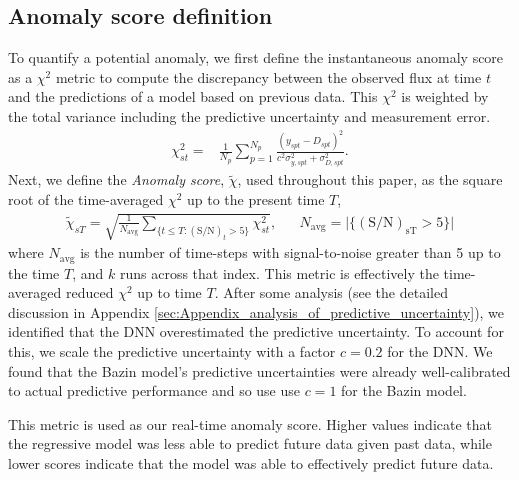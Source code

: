 \documentclass[fleqn,usenatbib]{mnras}
\begin{document}
\subsection{Anomaly score definition}
\label{sec:Anomaly_score_definition}
To quantify a potential anomaly, we first define the instantaneous anomaly score as a $\chi^2$ metric to compute the discrepancy between the observed flux at time $t$ and the predictions of a model based on previous data. This $\chi^2$ is weighted by the total variance including the predictive uncertainty and measurement error.
\begin{equation}
    \begin{split}
    \chi^2_{st} = & \frac{1}{N_p} \sum^{N_p}_{p=1} { \frac{\left( y_{spt}-D_{spt} \right)^2}{ c^2 \sigma_{y,{spt}}^2 + \sigma_{D,{spt}}^2} }.
    \end{split}
\label{eq:instantaneous_anomaly_score}
\end{equation}
Next, we define the \textit{Anomaly score}, $\tilde{\chi}$, used throughout this paper, as the square root of the time-averaged $\chi^2$ up to the present time $T$,
\begin{align}
    \tilde{\chi}_{sT} = \sqrt{ \frac{1}{N_\mathrm{avg}} \sum_{\{t \le T : \mathrm{(S/N)}_t > 5 \}} {\chi^2_{st}}}, && N_\mathrm{avg} = \lvert \{ \mathrm{(S/N)_{sT}} > 5 \} \rvert
    \label{eq:Anomaly_score}
\end{align}
where $N_\mathrm{avg}$ is the number of time-steps with signal-to-noise greater than 5 up to the time $T$, and $k$ runs across that index. This metric is effectively the time-averaged reduced $\chi^2$ up to time $T$. After some analysis (see the detailed discussion in Appendix \ref{sec:Appendix_analysis_of_predictive_uncertainty}), we identified that the DNN overestimated the predictive uncertainty. To account for this, we scale the predictive uncertainty with a factor $c=0.2$ for the DNN. We found that the Bazin model's predictive uncertainties were already well-calibrated to actual predictive performance and so use use $c=1$ for the Bazin model. 

This metric is used as our real-time anomaly score. Higher values indicate that the regressive model was less able to predict future data given past data, while lower scores indicate that the model was able to effectively predict future data. 
\end{document}
